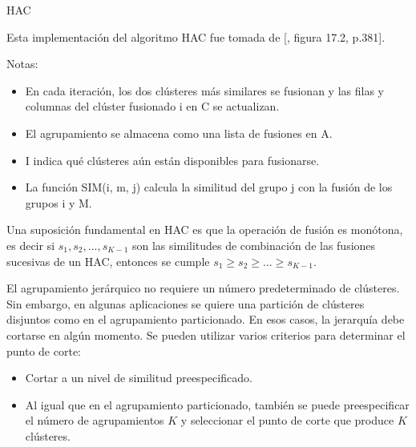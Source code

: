 \documentclass{llncs}
\DeclareMathOperator*{\argmax}{arg\,max}
\begin{document}
\begin{algorithm}
	\caption{HAC}
	\begin{algorithmic}[1]
		\EndFor
		\EndFor
		\State{$ <i,m> \leftarrow \argmax_{<i,m>:i \neq \wedge I[i] = 1 \wedge I[m] = 1} C[i][m] $}
		\EndFor
		\EndFor
	\end{algorithmic}
\end{algorithm}

Esta implementaci\'on del algoritmo HAC fue tomada de [\cite{B1}, figura 17.2, p.381].

\newpage
Notas: 
\begin{itemize}
	\item En cada iteración, los dos clústeres m\'as similares se fusionan y las filas y columnas del clúster fusionado i en C se actualizan.
	\item El agrupamiento se almacena como una lista de fusiones en A.
	\item I indica qué clústeres aún están disponibles para fusionarse. 
	\item La función SIM(i, m, j) calcula la similitud del grupo j con la fusión de los grupos i y M.
\end{itemize}

Una suposición fundamental en HAC es que la operación de fusión es mon\'otona, es decir si $ s_{1}, s_{2}, . . . , s_{K-1}$ son las similitudes de combinación de las fusiones sucesivas de un HAC, entonces se cumple $ s_{1} \geq s_{2} \geq . . . \geq s_{K-1}$.

El agrupamiento jerárquico no requiere un número predeterminado de clústeres. Sin embargo, en algunas aplicaciones se quiere una partición de clústeres disjuntos como en el agrupamiento particionado. En esos casos, la jerarquía debe cortarse en algún momento. Se pueden utilizar varios criterios para determinar el punto de corte:
\begin{itemize}
	\item Cortar a un nivel de similitud preespecificado.
	\item Al igual que en el agrupamiento particionado, también se puede preespecificar el número de agrupamientos $ K $ y seleccionar el punto de corte que produce $ K $ cl\'usteres.
\end{itemize}
\end{document}
